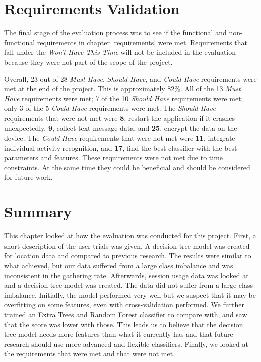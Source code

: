 \documentclass{l4proj}
\begin{document}
\section{Requirements Validation}
The final stage of the evaluation process was to see if the functional and non-functional requirements in chapter \ref{requirements} were met. Requirements that fall under the \textit{Won't Have This Time} will not be included in the evaluation because they were not part of the scope of the project.

Overall, 23 out of 28 \textit{Must Have}, \textit{Should Have}, and \textit{Could Have} requirements were met at the end of the project. This is approximately 82\%. All of the 13 \textit{Must Have} requirements were met; 7 of the 10 \textit{Should Have} requirements were met; only 3 of the 5 \textit{Could Have} requirements were met. The \textit{Should Have} requirements that were not met were \textbf{8}, restart the application if it crashes unexpectedly, \textbf{9}, collect text message data, and \textbf{25}, encrypt the data on the device. The \textit{Could Have} requirements that were not met were \textbf{11}, integrate individual activity recognition, and \textbf{17}, find the best classifier with the best parameters and features. These requirements were not met due to time constraints. At the same time they could be beneficial and should be considered for future work.


\section{Summary}
This chapter looked at how the evaluation was conducted for this project. First, a short description of the user trials was given. A decision tree model was created for location data and compared to previous research. The results were similar to what \cite{wood, boukhechba} achieved, but our data suffered from a large class imbalance and was inconsistent in the gathering rate. Afterwards, session usage data was looked at and a decision tree model was created. The data did not suffer from a large class imbalance. Initially, the model performed very well but we suspect that it may be overfitting on some features, even with cross-validation performed. We further trained an Extra Trees and Random Forest classifier to compare with, and saw that the score was lower with those. This leads us to believe that the decision tree model needs more features than what it currently has and that future research should use more advanced and flexible classifiers. Finally, we looked at the requirements that were met and that were not met.
\end{document}
